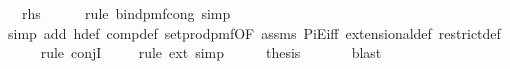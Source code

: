 \begin{isabellebody}
\ {\isachardoublequoteopen}{\isachardot}{\kern0pt}{\isachardot}{\kern0pt}{\isachardot}{\kern0pt}\ {\isacharequal}{\kern0pt}\ {\isacharquery}{\kern0pt}rhs{\isachardoublequoteclose}\isanewline
\ \ \ \ \isamarkupfalse%
\ {\isacharparenleft}{\kern0pt}rule\ bind{\isacharunderscore}{\kern0pt}pmf{\isacharunderscore}{\kern0pt}cong\ {\isacharcomma}{\kern0pt}simp{\isacharparenright}{\kern0pt}\isanewline
\ \ \ \ \isamarkupfalse%
\ {\isacharparenleft}{\kern0pt}simp\ add{\isacharcolon}{\kern0pt}\ h{\isacharunderscore}{\kern0pt}def\ comp{\isacharunderscore}{\kern0pt}def\ set{\isacharunderscore}{\kern0pt}prod{\isacharunderscore}{\kern0pt}pmf{\isacharbrackleft}{\kern0pt}OF\ assms{\isacharparenleft}{\kern0pt}{}{\isacharparenright}{\kern0pt}{\isacharbrackright}{\kern0pt}\ PiE{\isacharunderscore}{\kern0pt}iff\ extensional{\isacharunderscore}{\kern0pt}def\ restrict{\isacharunderscore}{\kern0pt}def{\isacharparenright}{\kern0pt}\isanewline
\ \ \ \ \isamarkupfalse%
\ {\isacharparenleft}{\kern0pt}rule\ conjI{\isacharparenright}{\kern0pt}\isanewline
\ \ \ \ \isamarkupfalse%
{\isacharparenleft}{\kern0pt}rule\ ext{\isacharcomma}{\kern0pt}\ simp{\isacharparenright}{\kern0pt}{\isacharplus}{\kern0pt}\isanewline
\ \ \isamarkupfalse%
\ \isamarkupfalse%
\ {\isacharquery}{\kern0pt}thesis\ \isanewline
\ \ \ \ \isamarkupfalse%
\ blast\isanewline
{}\isamarkupfalse%
%
\endisatagproof
{\isafoldproof}%
%
\isadelimproof
\isanewline
%
\endisadelimproof
%
\isadelimtheory
\isanewline
%
\endisadelimtheory
%
\isatagtheory
{}\isamarkupfalse%
%
\endisatagtheory
{\isafoldtheory}%
%
\isadelimtheory
%
\endisadelimtheory
%
\end{isabellebody}%
\endinput
